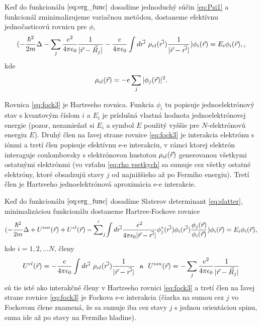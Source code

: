 Keď do funkcionálu $\eqref{eq:erg_func}$ dosadíme jednoduchý súčin \eqref{eq:Psi1} a funkcionál zminimalizujeme variačnou metódou,
dostaneme efektívnu jednočasticovú rovnicu pre $\phi$,
\begin{equation}
\label{eq:fock3}
(-\frac{\hbar^2}{2m}\Delta -\sum_j\frac{e^2}{4\pi \epsilon_0}{\frac{1}{|\vec{r}-\vec{R}_j|}} -\frac{e}{4\pi \epsilon_0} \int d\vec{r'}\ \rho_{el}(\vec{r'}) \frac {1}{|\vec{r}-\vec{r'}|})\phi_i({\vec{r}})=E_i\phi_i(\vec{r}), \text{,}
\end{equation}
kde 
\begin{equation}
\label{eq:rho vsetkych}
\rho_{el}(\vec{r})=-e \sum_j |\phi_j(\vec{r})|^2 \text{.}
\end{equation}

Rovnica \eqref{eq:fock3} je Hartreeho rovnica. Funkcia $\phi_i$ tu popisuje jednoelektrónový stav s kvantovým číslom $i$ a $E_i$ je príslušná vlastná hodnota jednoelektrónovej energie (pozor, nezamieňať si $E_i$ a symbol $E$ použitý vyššie pre $N$-elektrónovú energiu $E$).
Druhý člen na ľavej strane rovnice \eqref{eq:fock3} je interakcia elektrónu s iónmi a tretí člen popisuje efektívnu e-e interakciu, v rámci ktorej elektrón interaguje coulombovsky s elektrónovou hustotou $\rho_{el}(\vec{r})$ generovanou
všetkymi ostatnými elektrónmi (vo vzťahu \eqref{eq:rho vsetkych} sa sumuje cez všetky ostatné elektróny, ktoré obsadzujú stavy $j$ od najnižšieho až po Fermiho energiu). Tretí člen je Hartreeho jednoelektrónová aproximácia e-e interakcie.

Keď do funkcionálu $\eqref{eq:erg_func}$ dosadíme Slaterov determinant \eqref{eq:slatter}, minimalizáciou funkcionálu dostaneme
Hartree-Fockove rovnice
\begin{equation}
\label{eq:fock3}
(-\frac{\hbar^2}{2m}\Delta +U^{ion}(\vec{r})+U^{el}(\vec{r})-
{\sum'}_j{\int d\vec{r'}\frac{e^2}{4\pi \epsilon_0|\vec{r}-\vec{r'}|}
\phi_j^{*}(\vec{r'})\phi_i(\vec{r'})\frac{\phi_j(\vec{r})}{\phi_i(\vec{r})}})\phi_i({\vec{r}})=E_i\phi_i(\vec{r}) \text{,}
\end{equation}
kde $i = 1, 2, \dots N$, členy
\begin{equation}
\label{eq:hartree a ion}
U^{el}(\vec{r}) = -\frac{e}{4\pi \epsilon_0} \int d\vec{r'}\ \rho_{el}(\vec{r'}) \frac {1}{|\vec{r}-\vec{r'}|} \ \  \text{a} \ \  U^{ion}(\vec{r}) = -\sum_j\frac{e^2}{4\pi \epsilon_0}{\frac{1}{|\vec{r}-\vec{R}_j|}}
\end{equation}
sú tie isté ako interakčné členy v Hartreeho rovnici \eqref{eq:fock3} a tretí člen na ľavej strane rovnice \eqref{eq:fock3}
je Fockova e-e interakcia (čiarka na sumou cez $j$ vo Fockovom člene znamená, že sa sumuje iba cez stavy $j$ s jednou orientáciou spinu, suma ide až po stavy na Fermiho hladine). 

